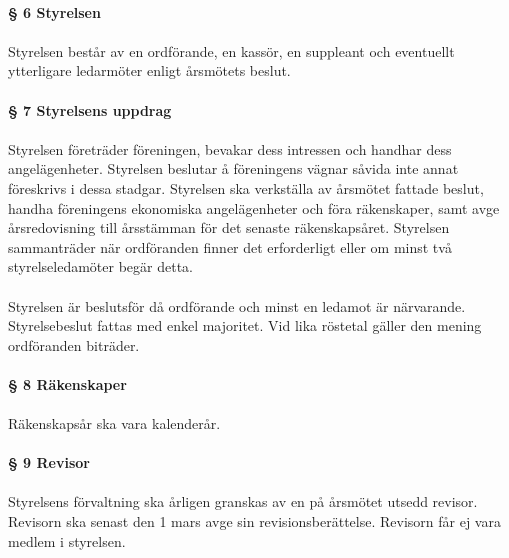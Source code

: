 \documentclass[12pt, a4paper]{article}
\begin{document}
\pagebreak


\paragraph{§ 6 Styrelsen}
\paragraph{}
Styrelsen består av en ordförande, en kassör, en suppleant och eventuellt ytterligare ledarmöter enligt årsmötets beslut.

\paragraph{§ 7 Styrelsens uppdrag}
\paragraph{}
Styrelsen företräder föreningen, bevakar dess intressen och handhar dess angelägenheter. Styrelsen beslutar å föreningens vägnar såvida inte annat
föreskrivs i dessa stadgar. Styrelsen ska verkställa av årsmötet fattade beslut, handha föreningens ekonomiska angelägenheter och föra räkenskaper,
samt avge årsredovisning till årsstämman för det senaste räkenskapsåret. Styrelsen sammanträder när ordföranden finner det erforderligt eller om
minst två styrelseledamöter begär detta.

\paragraph{}
Styrelsen är beslutsför då ordförande och minst en ledamot är närvarande. Styrelsebeslut fattas med enkel majoritet. Vid lika röstetal gäller den mening
ordföranden biträder.

\paragraph{§ 8 Räkenskaper}
\paragraph{}
Räkenskapsår ska vara kalenderår.

\paragraph{§ 9 Revisor}
\paragraph{}
Styrelsens förvaltning ska årligen granskas av en på årsmötet utsedd revisor. Revisorn ska senast den 1 mars avge sin revisionsberättelse. Revisorn får ej vara medlem i styrelsen.
\end{document}

